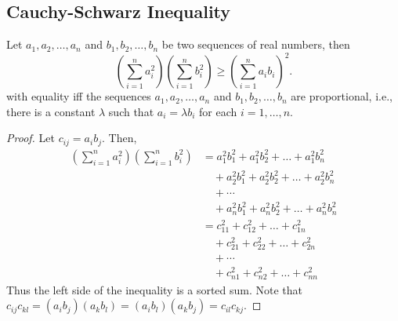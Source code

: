 \documentclass[../main.tex]{subfiles}
\begin{document}
\subsection{Cauchy-Schwarz Inequality}
\begin{thm} \label{thm:cauchy}
    Let $a_1, a_2, \dots, a_n$ and $b_1, b_2, \dots, b_n$ be two sequences of real numbers, then
    \[
        \left( \sum_{i=1}^n a_i^2 \right) \left( \sum_{i=1}^n b_i^2 \right) \geq \left( \sum_{i=1}^n a_i b_i \right)^2.
    \]
    with equality iff the sequences $a_1, a_2, \dots, a_n$ and $b_1, b_2, \dots, b_n$ are proportional, i.e., there is a constant $\lambda$ such that $a_i = \lambda b_i$ for each $i = 1, \dots, n$.
\end{thm}
\begin{proof}
    Let $c_{ij} = a_i b_j$.
    Then, 
    \begin{align*}
        \left( \sum_{i=1}^n a_i^2\right) \left( \sum_{i=1}^n b_i^2\right) &= a_1^2 b_1^2 + a_1^2 b_2^2 + \dots + a_1^2 b_n^2\\
                                                                          &\quad + a_2^2 b_1^2 + a_2^2 b_2^2 + \dots + a_2^2 b_n^2\\
                                                                          &\quad + \cdots\\
                                                                          &\quad + a_n^2 b_1^2 + a_n^2 b_2^2 + \dots + a_n^2 b_n^2\\
                                                                          &= c_{11}^2 + c_{12}^2 + \dots + c_{1n}^2\\
                                                                          &\quad + c_{21}^2 + c_{22}^2 + \dots + c_{2n}^2\\
                                                                          &\quad + \cdots\\
                                                                          &\quad + c_{n1}^2 + c_{n2}^2 + \dots + c_{nn}^2
    \end{align*}
    Thus the left side of the inequality is a sorted sum.
    Note that $c_{ij} c_{kl} = (a_i b_j)(a_k b_l) = (a_i b_l)(a_k b_j) = c_{il} c_{kj}$.


\end{proof}
\end{document}
